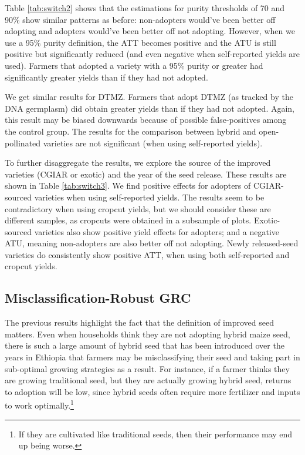 \documentclass[11pt]{article}
\begin{document}
Table \ref{tab:switch2} shows that the estimations for purity thresholds of 70 and 90\% show similar patterns as before: non-adopters would've been better off adopting and adopters would've been better off not adopting. However, when we use a 95\% purity definition, the ATT becomes positive and the ATU is still positive but significantly reduced (and even negative when self-reported yields are used). Farmers that adopted a variety with a 95\% purity or greater had significantly greater yields than if they had not adopted. 

We get similar results for DTMZ. Farmers that adopt DTMZ (as tracked by the DNA germplasm) did obtain greater yields than if they had not adopted. Again, this result may be biased downwards because of possible false-positives among the control group. The results for the comparison between hybrid and open-pollinated varieties are not significant (when using self-reported yields).



To further disaggregate the results, we explore the source of the improved varieties (CGIAR or exotic) and the year of the seed release. These results are shown in Table \ref{tab:switch3}. We find positive effects for adopters of CGIAR-sourced varieties when using self-reported yields. The results seem to be contradictory when using cropcut yields, but we should consider these are different samples, as cropcuts were obtained in a subsample of plots. Exotic-sourced varieties also show positive yield effects for adopters; and a negative ATU, meaning non-adopters are also better off not adopting. Newly released-seed varieties do consistently show positive ATT, when using both self-reported and cropcut yields. 



\subsection{Misclassification-Robust GRC}

The previous results highlight the fact that the definition of improved seed matters. Even when households think they are not adopting hybrid maize seed, there is such a large amount of hybrid seed that has been introduced over the years in Ethiopia that farmers may be misclassifying their seed and taking part in sub-optimal growing strategies as a result. For instance, if a farmer thinks they are growing traditional seed, but they are actually growing hybrid seed, returns to adoption will be low, since hybrid seeds often require more fertilizer and inputs to work optimally.\footnote{ If they are cultivated like traditional seeds, then their performance may end up being worse.}
\end{document}
